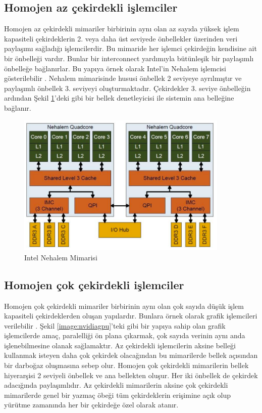 \subsection{Homojen az çekirdekli işlemciler}
Homojen az çekirdekli mimariler birbirinin aynı olan az sayıda yüksek işlem kapasiteli çekirdeklerin 2. veya daha üst seviyede önbellekler üzerinden veri paylaşımı sağladığı işlemcilerdir. Bu mimaride her işlemci çekirdeğin kendisine ait bir önbelleği vardır. Bunlar bir interconnect yardımıyla bütünleşik bir paylaşımlı önbelleğe bağlanırlar. Bu yapıya örnek olarak Intel'in Nehalem işlemcisi gösterilebilir \cite{molka2009memory} \cite{hackenberg2009comparing}. Nehalem mimarisinde hususi önbellek 2 seviyeye ayrılmıştır ve paylaşımlı önbellek 3. seviyeyi oluşturmaktadır. Çekirdekler 3. seviye önbelleğin ardından Şekil \ref{image:nehalem}'deki gibi bir bellek denetleyicisi ile sistemin ana belleğine bağlanır.\par

\begin{figure}
\centering
\shorthandoff{=}
\includegraphics[width=0.9\textwidth]{gorsel/nehalem.jpg}
\shorthandoff{=}
\caption{Intel Nehalem Mimarisi}
\label{image:nehalem}
\end{figure}

\subsection{Homojen çok çekirdekli işlemciler}
Homojen çok çekirdekli mimariler birbirinin aynı olan çok sayıda düşük işlem kapasiteli çekirdeklerden oluşan yapılardır. Bunlara örnek olarak grafik işlemcileri verilebilir \cite{MCSE.2012.23}. Şekil \ref{image:nvidiagpu}'teki gibi bir yapıya sahip olan grafik işlemcilerde amaç, paralelliği ön plana çıkarmak, çok sayıda verinin aynı anda işlenebilmesine olanak sağlamaktır. Az çekirdekli işlemcilerin aksine belleği kullanmak isteyen daha çok çekirdek olacağından bu mimarilerde bellek açısından bir darboğaz oluşmasına sebep olur. Homojen çok çekirdekli mimarilerin bellek hiyerarşisi 2 seviyeli önbellek ve ana bellekten oluşur. Her iki önbellek de çekirdek adacığında paylaşımlıdır. Az çekirdekli mimarilerin aksine çok çekirdekli mimarilerde genel bir yazmaç öbeği tüm çekirdeklerin erişimine açık olup yürütme zamanında her bir çekirdeğe özel olarak atanır.

